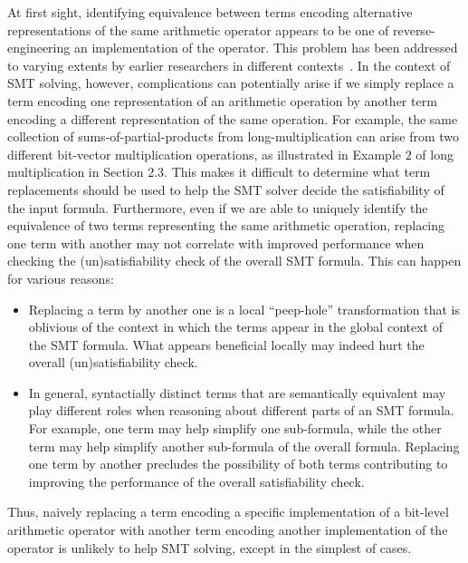 At first sight, identifying equivalence between terms encoding
alternative representations of the same arithmetic operator appears to
be one of reverse-engineering an implementation of the operator.  This
problem has been addressed to varying extents by earlier researchers
in different contexts~\cite{reveng,earlier-pat-match-synopsys}.  In the
context of SMT solving, however, complications can potentially arise
if we simply replace a term encoding one representation of an
arithmetic operation by another term encoding a different
representation of the same operation. For example, the same collection
of sums-of-partial-products from long-multiplication can arise from
two different bit-vector multiplication operations, as illustrated in
Example $2$ of long multiplication in Section 2.3.  This makes it
difficult to determine what term replacements should be used to help
the SMT solver decide the satisfiability of the input formula.
Furthermore, even if we are able to uniquely identify the equivalence
of two terms representing the same arithmetic operation, replacing one
term with another may not correlate with improved performance when
checking the (un)satisfiability check of the overall SMT formula.
This can happen for various reasons:
\begin{itemize}
\item Replacing a term by another one is a local ``peep-hole'' transformation
      that is oblivious of the context in which the terms appear in
      the global context of the SMT formula.  What appears beneficial
      locally may indeed hurt the overall (un)satisfiability check.
\item In general, syntactially distinct terms that are semantically equivalent
      may play different roles when reasoning about different parts of
  an SMT formula.  For example, one term may help simplify one sub-formula,
  while the other term may help simplify another sub-formula of the overall
  formula. Replacing one term by another precludes the possibility of both
  terms contributing to improving the performance of the overall satisfiability
  check.
\end{itemize}
Thus, naively replacing a term encoding a specific implementation of a
bit-level arithmetic operator with another term encoding another
implementation of the operator is unlikely to help SMT solving, except
in the simplest of cases.

